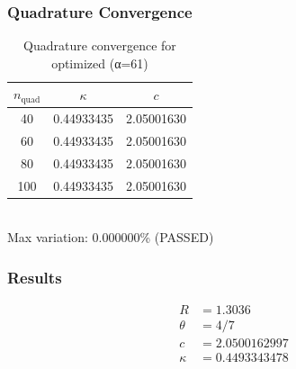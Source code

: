 \subsubsection{Quadrature Convergence}
\begin{table}[h]
\centering
\caption{Quadrature convergence for optimized (α=61)}
\begin{tabular}{ccc}
\hline
$n_{\text{quad}}$ & $\kappa$ & $c$ \\
\hline
40 & 0.44933435 & 2.05001630 \\
60 & 0.44933435 & 2.05001630 \\
80 & 0.44933435 & 2.05001630 \\
100 & 0.44933435 & 2.05001630 \\
\hline
\end{tabular}
\\Max variation: 0.000000\% (\checkmark PASSED)
\end{table}

\subsubsection{Results}
\begin{align*}
R &= 1.3036 \\
\theta &= 4/7 \\
c &= 2.0500162997 \\
\kappa &= 0.4493343478
\end{align*}